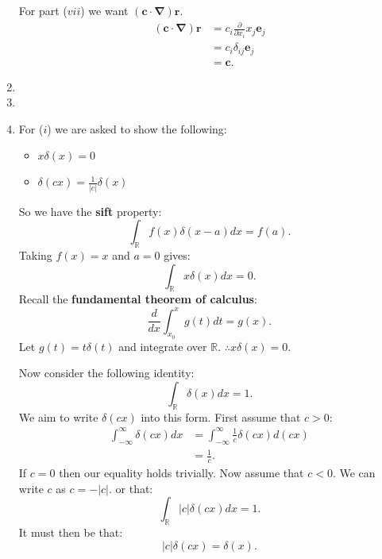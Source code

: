 \begin{enumerate}
    For part ($vii$) we want $(\boldsymbol{c}\cdot\boldsymbol{\nabla})
    \boldsymbol{r}$.
    \begin{align*}
        (\boldsymbol{c}\cdot\boldsymbol{\nabla})\boldsymbol{r}
        &=c_i\frac{\partial}{\partial x_i}x_j\boldsymbol{e}_j\\
        &=c_i\delta_{ij}\boldsymbol{e}_j \\
        &=\boldsymbol{c}.
    \end{align*}

    \newpage
    
    \item


    \newpage


    \item 


    \newpage


    \item For ($i$) we are asked to show the following:
    \begin{itemize}
        \item $x\delta(x)=0$
        \item $\delta(cx)=\frac{1}{|c|}\delta(x)$
    \end{itemize}
    So we have the \textbf{sift} property:
    $$\int_{\mathbb{R}}f(x)\delta(x-a)dx=f(a).$$
    Taking $f(x)=x$ and $a=0$ gives:
    $$\int_{\mathbb{R}}x\delta(x)dx=0.$$
    Recall the \textbf{fundamental theorem of calculus}:
    $$\frac{d}{dx}\int_{x_0}^{x}g(t)dt=g(x).$$
    Let $g(t)=t\delta(t)$ and integrate over $\mathbb{R}$.
    $\therefore x\delta(x)=0.$
    
    Now consider the following identity:
    $$\int_{\mathbb{R}}\delta(x)dx=1.$$
    We aim to write $\delta(cx)$ into this form. First assume that $c>0$:
    \begin{align*}
        \int_{-\infty}^{\infty}\delta(cx)dx
        &= \int_{-\infty}^{\infty}\frac{1}{c}\delta(cx)d(cx) \\
        &= \frac{1}{c}.
    \end{align*}
    If $c=0$ then our equality holds trivially. Now assume that $c<0$.
    We can write $c$ as $c=-|c|$.
    or that:
    $$\int_{\mathbb{R}}|c|\delta(cx)dx=1.$$
    It must then be that:
    $$|c|\delta(cx)=\delta(x).$$
\end{enumerate}